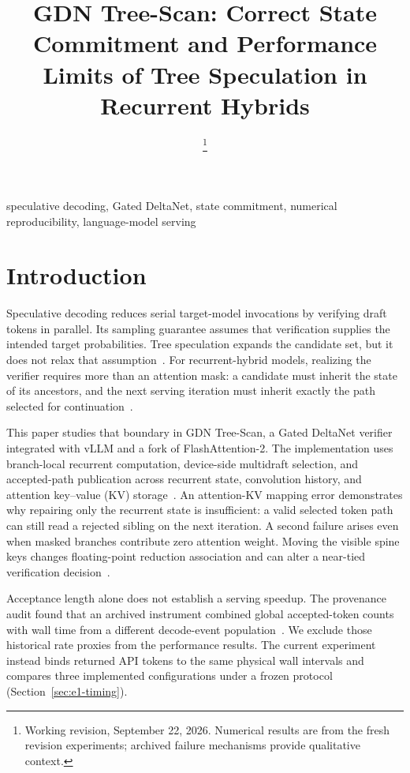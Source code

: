 \documentclass[conference]{IEEEtran}
\newcommand{\sys}{GDN Tree-Scan}
\begin{document}
\title{GDN Tree-Scan: Correct State Commitment and Performance Limits of Tree Speculation in Recurrent Hybrids}
\author{
\thanks{Working revision, September 22, 2026. Numerical results are from the fresh revision experiments; archived failure mechanisms provide qualitative context.}}
\maketitle

\begin{IEEEkeywords}
speculative decoding, Gated DeltaNet, state commitment, numerical reproducibility, language-model serving
\end{IEEEkeywords}

\section{Introduction}
Speculative decoding reduces serial target-model invocations by verifying draft tokens in parallel. Its sampling guarantee assumes that verification supplies the intended target probabilities. Tree speculation expands the candidate set, but it does not relax that assumption~\cite{leviathan2023fast,chen2023sampling,miao2023specinfer}. For recurrent-hybrid models, realizing the verifier requires more than an attention mask: a candidate must inherit the state of its ancestors, and the next serving iteration must inherit exactly the path selected for continuation~\cite{yang2024gated,wu2025stree}.

This paper studies that boundary in \sys{}, a Gated DeltaNet verifier integrated with vLLM and a fork of FlashAttention-2. The implementation uses branch-local recurrent computation, device-side multidraft selection, and accepted-path publication across recurrent state, convolution history, and attention key--value (KV) storage~\cite{lumo2026receipts,lumo2026stateless}. An attention-KV mapping error demonstrates why repairing only the recurrent state is insufficient: a valid selected token path can still read a rejected sibling on the next iteration. A second failure arises even when masked branches contribute zero attention weight. Moving the visible spine keys changes floating-point reduction association and can alter a near-tied verification decision~\cite{lumo2026spine}.

Acceptance length alone does not establish a serving speedup. The provenance audit found that an archived instrument combined global accepted-token counts with wall time from a different decode-event population~\cite{lumo2026cost,lumo2026archive}. We exclude those historical rate proxies from the performance results. The current experiment instead binds returned API tokens to the same physical wall intervals and compares three implemented configurations under a frozen protocol (Section~\ref{sec:e1-timing}).
\end{document}
